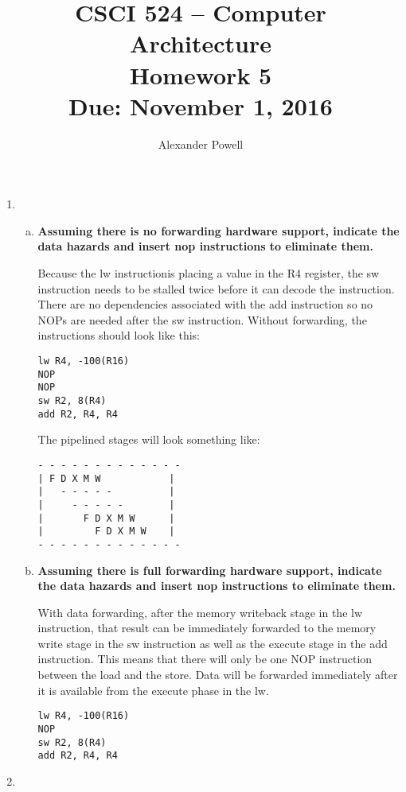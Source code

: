 \documentclass[10pt]{article} %
\title{CSCI 524 -- Computer Architecture \\
Homework 5 \\
{\large{\bf Due: November 1, 2016}}}
\date{}
\author{Alexander Powell}
\begin{document}
\maketitle
\begin{enumerate}

\item %
\begin{enumerate}[(a)]
\item
\textbf{Assuming there is no forwarding hardware support, indicate the data hazards and insert nop instructions to eliminate them. }

Because the lw instructionis placing a value in the R4 register, the sw instruction needs to be stalled twice before it can decode the instruction.  There are no dependencies associated with the add instruction so no NOPs are needed after the sw instruction.  Without forwarding, the instructions should look like this:

\begin{verbatim}
lw R4, -100(R16)
NOP
NOP
sw R2, 8(R4)
add R2, R4, R4
\end{verbatim}

The pipelined stages will look something like:

\begin{verbatim}
- - - - - - - - - - - - -
| F D X M W            |
|   - - - - -          |
|     - - - - -        |
|       F D X M W      |
|         F D X M W    |
- - - - - - - - - - - - -
\end{verbatim}

\item
\textbf{Assuming there is full forwarding hardware support, indicate the data hazards and insert nop instructions to eliminate them. }

With data forwarding, after the memory writeback stage in the lw instruction, that result can be immediately forwarded to the memory write stage in the sw instruction as well as the execute stage in the add instruction.  This means that there will only be one NOP instruction between the load and the store.  Data will be forwarded immediately after it is available from the execute phase in the lw.  

\begin{verbatim}
lw R4, -100(R16)
NOP
sw R2, 8(R4)
add R2, R4, R4
\end{verbatim}

\end{enumerate}

\item %


\end{enumerate}
\end{document}
